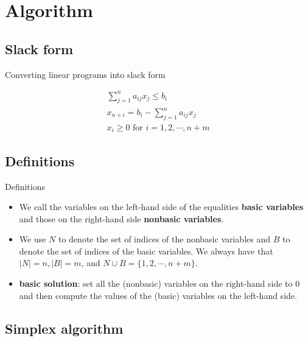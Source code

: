 \section{Algorithm}

\subsection{Slack form}

\begin{frame}{Converting linear programs into slack form}

    \begin{gather*}
        \sum_{j=1}^{n}a_{ij}x_j \le b_i\\
        x_{n+i} = b_{i} - \sum_{j=1}^{n}a_{ij}x_j\\
        x_i\ge 0 \text{ for } i = 1,2,\cdots,n+m
    \end{gather*}

\end{frame}

\subsection{Definitions}

\begin{frame}{Definitions}

    \begin{itemize}
        \item We call the variables on the left-hand side of
              the equalities \textbf{basic variables} and those on the right-hand side
              \textbf{nonbasic variables}.
        \item We use $N$ to denote the set of indices of the nonbasic variables
              and $B$ to denote the set of indices of the basic variables.
              We always have that $|N|=n,|B|=m$, and $N\cup B=\{1, 2,\cdots, n+m\}$.
        \item \textbf{basic solution}: set all the (nonbasic) variables on the
              right-hand side to $0$ and then compute the values of the (basic) variables
              on the left-hand side.
    \end{itemize}

\end{frame}

\subsection{Simplex algorithm}

